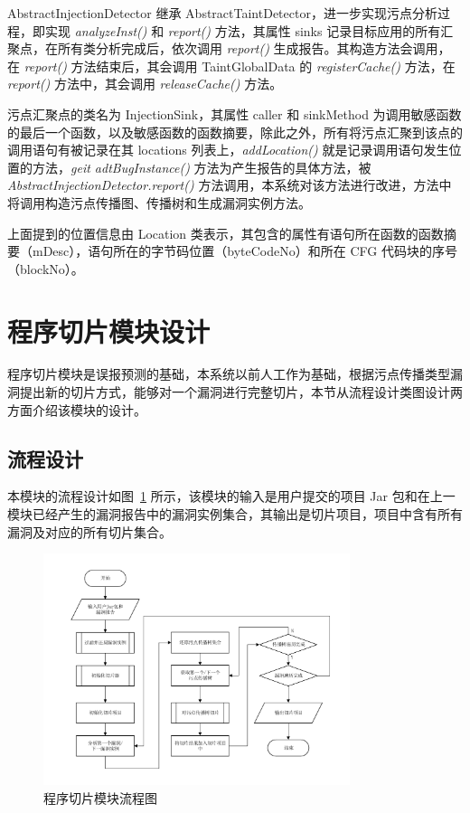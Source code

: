 AbstractInjectionDetector 继承 AbstractTaintDetector，进一步实现污点分析过程，即实现 \textit{analyzeInst()} 和 \textit{report()} 方法，其属性 sinks 记录目标应用的所有汇聚点，在所有类分析完成后，依次调用 \textit{report()} 生成报告。其构造方法会调用，在 \textit{report()} 方法结束后，其会调用 TaintGlobalData 的 \textit{registerCache()} 方法，在 \textit{report()} 方法中，其会调用 \textit{releaseCache()} 方法。

污点汇聚点的类名为 InjectionSink，其属性 caller 和 sinkMethod 为调用敏感函数的最后一个函数，以及敏感函数的函数摘要，除此之外，所有将污点汇聚到该点的调用语句有被记录在其 locations 列表上，\textit{addLocation()} 就是记录调用语句发生位置的方法，\textit{geit adtBugInstance()} 方法为产生报告的具体方法，被 \textit{AbstractInjectionDetector.report()} 方法调用，本系统对该方法进行改进，方法中将调用构造污点传播图、传播树和生成漏洞实例方法。

上面提到的位置信息由 Location 类表示，其包含的属性有语句所在函数的函数摘要（mDesc），语句所在的字节码位置（byteCodeNo）和所在 CFG 代码块的序号（blockNo）。

\section{程序切片模块设计}

程序切片模块是误报预测的基础，本系统以前人工作为基础，根据污点传播类型漏洞提出新的切片方式，能够对一个漏洞进行完整切片，本节从流程设计类图设计两方面介绍该模块的设计。
\subsection{流程设计}

本模块的流程设计如图~\ref{sliceProcessing} 所示，该模块的输入是用户提交的项目 Jar 包和在上一模块已经产生的漏洞报告中的漏洞实例集合，其输出是切片项目，项目中含有所有漏洞及对应的所有切片集合。

\begin{figure}[!htb]
    \centering
    \includegraphics[width=0.8\textwidth]{FIGs/chapter3/sliceProcessing.pdf}
    \caption{程序切片模块流程图}\label{sliceProcessing}
\end{figure}

